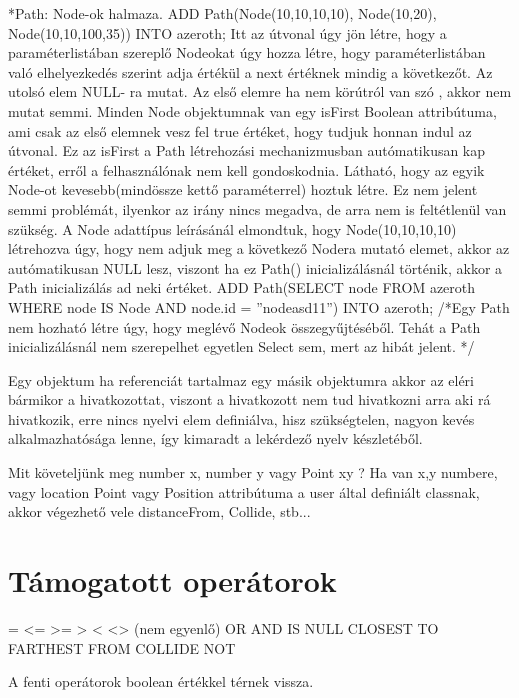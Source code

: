 *Path: Node-ok halmaza.
ADD Path(Node(10,10,10,10), Node(10,20), Node(10,10,100,35)) INTO azeroth;
Itt az útvonal úgy jön létre, hogy a paraméterlistában szereplő Nodeokat úgy hozza létre, hogy paraméterlistában való elhelyezkedés szerint adja értékül a next értéknek mindig a következőt. Az utolsó elem NULL- ra mutat. Az első elemre ha nem körútról van szó , akkor nem mutat semmi. Minden Node objektumnak van egy isFirst Boolean attribútuma, ami csak az első elemnek vesz fel true értéket, hogy tudjuk honnan indul az útvonal. Ez az isFirst a Path létrehozási mechanizmusban autómatikusan kap értéket, erről a felhasználónak nem kell gondoskodnia.
Látható, hogy az egyik Node-ot kevesebb(mindössze kettő paraméterrel) hoztuk létre. Ez nem jelent semmi problémát, ilyenkor az irány nincs megadva, de arra nem is feltétlenül van szükség.
A Node adattípus leírásánál elmondtuk, hogy Node(10,10,10,10) létrehozva úgy, hogy nem adjuk meg a következő Nodera mutató elemet, akkor az autómatikusan NULL lesz, viszont ha ez Path() inicializálásnál történik, akkor a Path inicializálás ad neki értéket.
ADD Path(SELECT node FROM azeroth WHERE node IS Node AND node.id = ”nodeasd11”) INTO azeroth; /*Egy Path nem hozható létre úgy, hogy  meglévő Nodeok összegyűjtéséből. Tehát a Path inicializálásnál nem szerepelhet egyetlen Select sem, mert az hibát jelent. */


Egy objektum ha referenciát tartalmaz egy másik objektumra akkor az eléri bármikor a hivatkozottat, viszont a hivatkozott nem tud hivatkozni arra aki rá hivatkozik, erre nincs nyelvi elem definiálva, hisz szükségtelen, nagyon kevés alkalmazhatósága lenne, így kimaradt a lekérdező nyelv készletéből.

Mit követeljünk meg number x, number y vagy Point xy ?
Ha van x,y numbere, vagy location Point vagy Position attribútuma a user által definiált classnak, akkor végezhető vele distanceFrom, Collide, stb...

\section{Támogatott operátorok}

= 
<= 
>= 
> 
< 
<> (nem egyenlő) 
OR 
AND 
IS 
NULL
CLOSEST TO
FARTHEST FROM
COLLIDE
NOT

A fenti operátorok boolean értékkel térnek vissza.

